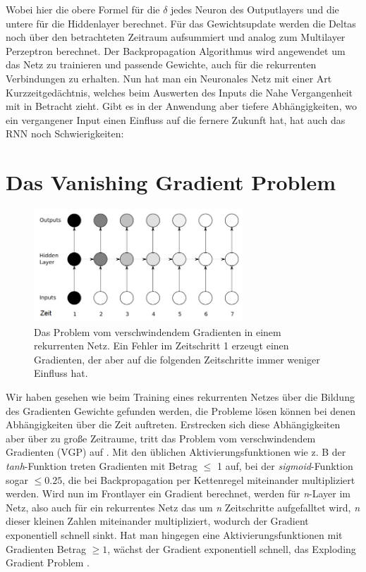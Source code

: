 Wobei hier die obere Formel für die $ \delta $ jedes Neuron des Outputlayers und die untere für die Hiddenlayer berechnet. Für das Gewichtsupdate werden die Deltas noch über den betrachteten Zeitraum aufsummiert und analog zum Multilayer Perzeptron berechnet. Der Backpropagation Algorithmus wird angewendet um das Netz zu trainieren und passende Gewichte, auch für die rekurrenten Verbindungen zu erhalten. Nun hat man ein Neuronales Netz mit einer Art Kurzzeitgedächtnis, welches beim Auswerten des Inputs die Nahe Vergangenheit mit in Betracht zieht. Gibt es in der Anwendung aber tiefere Abhängigkeiten, wo ein vergangener Input einen Einfluss auf die fernere Zukunft hat, hat auch das RNN noch Schwierigkeiten: 
\section{Das Vanishing Gradient Problem}
\begin{figure}
	\centering
	\includegraphics[width=0.7\textwidth, height=160px]{pics/vgp.jpg}	
	\caption{Das Problem vom verschwindendem Gradienten in einem rekurrenten Netz. Ein Fehler im Zeitschritt 1 erzeugt einen Gradienten, der aber auf die folgenden Zeitschritte immer weniger Einfluss hat.\cite{bib:graves}}
	\label{img:vgp}
\end{figure}
Wir haben gesehen wie beim Training eines rekurrenten Netzes über die Bildung des Gradienten Gewichte gefunden werden, die Probleme lösen können bei denen Abhängigkeiten über die Zeit auftreten. Erstrecken sich diese Abhängigkeiten aber über zu große Zeitraume, tritt das Problem vom verschwindendem Gradienten (VGP) auf \cite{bib:vgp}. Mit den üblichen Aktivierungsfunktionen wie z. B der \textit{tanh}-Funktion treten Gradienten mit Betrag \(\leq\) 1 auf, bei der \textit{sigmoid}-Funktion sogar \(\leq 0.25\), die bei Backpropagation per Kettenregel miteinander multipliziert werden. Wird nun im Frontlayer ein Gradient berechnet, werden für \textit{n}-Layer im Netz, also auch für ein rekurrentes Netz das um \textit{n} Zeitschritte aufgefalltet wird, \textit{n} dieser kleinen Zahlen miteinander multipliziert, wodurch der Gradient exponentiell schnell sinkt. Hat man hingegen eine Aktivierungsfunktionen mit Gradienten Betrag \(\geq 1\), wächst der Gradient exponentiell schnell, das Exploding Gradient Problem \cite{bib:egp}.

